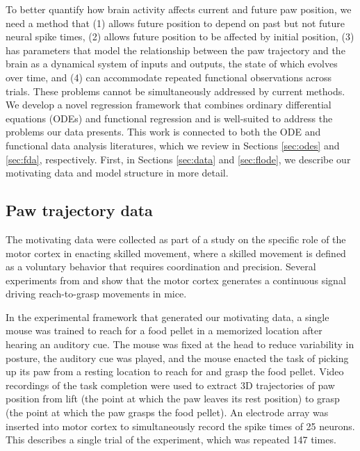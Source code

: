 \documentclass[preprint]{JASA}
\begin{document}
To better quantify how brain activity affects current and future paw
position, we need a method that (1) allows future position to depend on
past but not future neural spike times, (2) allows future position to be
affected by initial position, (3) has parameters that model the
relationship between the paw trajectory and the brain as a dynamical
system of inputs and outputs, the state of which evolves over time, and
(4) can accommodate repeated functional observations across trials.
These problems cannot be simultaneously addressed by current methods. We
develop a novel regression framework that combines ordinary differential
equations (ODEs) and functional regression and is well-suited to address
the problems our data presents. This work is connected to both the ODE
and functional data analysis literatures, which we review in Sections
\ref{sec:odes} and \ref{sec:fda}, respectively. First, in Sections
\ref{sec:data} and \ref{sec:flode}, we describe our motivating data and
model structure in more detail.

\hypertarget{paw-trajectory-data}{%
\subsection{Paw trajectory data}\label{paw-trajectory-data}}

\label{sec:data}

The motivating data were collected as part of a study on the specific
role of the motor cortex in enacting skilled movement, where a skilled
movement is defined as a voluntary behavior that requires coordination
and precision. Several experiments from \cite{guo2015} and
\cite{sauerbrei2018} show that the motor cortex generates a continuous
signal driving reach-to-grasp movements in mice.

In the experimental framework that generated our motivating data, a
single mouse was trained to reach for a food pellet in a memorized
location after hearing an auditory cue. The mouse was fixed at the head
to reduce variability in posture, the auditory cue was played, and the
mouse enacted the task of picking up its paw from a resting location to
reach for and grasp the food pellet. Video recordings of the task
completion were used to extract 3D trajectories of paw position from
lift (the point at which the paw leaves its rest position) to grasp (the
point at which the paw grasps the food pellet). An electrode array was
inserted into motor cortex to simultaneously record the spike times of
25 neurons. This describes a single trial of the experiment, which was
repeated 147 times.
\end{document}
